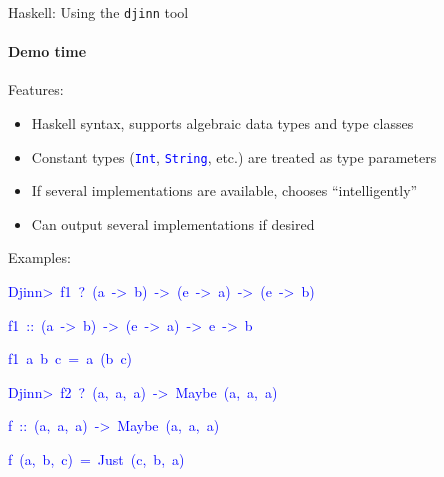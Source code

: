\documentclass[english]{beamer}
\newenvironment{lyxcode}
   {\par\begin{list}{}{
     \setlength{\rightmargin}{\leftmargin}
     \setlength{\listparindent}{0pt}%
     \raggedright
     \setlength{\itemsep}{0pt}
     \setlength{\parsep}{0pt}
     \normalfont\ttfamily}%
    \def\{{\char`\{}
    \def\}{\char`\}}
    \def\textasciitilde{\char`\~}
    \item[]}
   {\end{list}}
\begin{document}
\begin{frame}{Haskell: Using the \texttt{djinn} tool}


\framesubtitle{Demo time}

Features:
\begin{itemize}
\item Haskell syntax, supports algebraic data types and type classes
\item Constant types (\texttt{\textcolor{blue}{\footnotesize{}Int}}, \texttt{\textcolor{blue}{\footnotesize{}String}},
etc.) are treated as type parameters
\item If several implementations are available, chooses ``intelligently''
\item Can output several implementations if desired
\end{itemize}
Examples:
\begin{lyxcode}
\textcolor{blue}{\footnotesize{}Djinn>~f1~?~(a~->~b)~->~(e~->~a)~->~(e~->~b)}{\footnotesize \par}

\textcolor{blue}{\footnotesize{}f1~::~(a~->~b)~->~(e~->~a)~->~e~->~b}{\footnotesize \par}

\textcolor{blue}{\footnotesize{}f1~a~b~c~=~a~(b~c)}{\footnotesize \par}

\textcolor{blue}{\footnotesize{}Djinn>~f2~?~(a,~a,~a)~->~Maybe~(a,~a,~a)~}{\footnotesize \par}

\textcolor{blue}{\footnotesize{}f~::~(a,~a,~a)~->~Maybe~(a,~a,~a)}{\footnotesize \par}

\textcolor{blue}{\footnotesize{}f~(a,~b,~c)~=~Just~(c,~b,~a)}{\footnotesize \par}
\end{lyxcode}
\end{frame}
\end{document}

